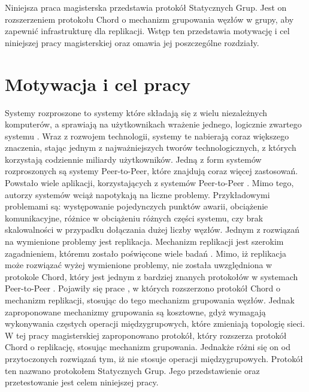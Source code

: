 \documentclass[12pt, twoside, openany]{report}
\begin{document}
Niniejsza praca magisterska przedstawia protokół Statycznych Grup. Jest on rozszerzeniem protokołu Chord o mechanizm grupowania węzłów w grupy, aby zapewnić infrastrukturę dla replikacji. Wstęp ten przedstawia motywację i cel niniejszej pracy magisterskiej oraz omawia jej poszczególne rozdziały.


\section{Motywacja i cel pracy}

Systemy rozproszone to systemy które składają się z wielu niezależnych komputerów, a sprawiają na użytkownikach wrażenie jednego, logicznie zwartego systemu \cite{bib:kobusinska}. Wraz z rozwojem technologii, systemy te nabierają coraz większego znaczenia, stając jednym z najważniejszych tworów technologicznych, z których  korzystają codziennie miliardy użytkowników. Jedną z form systemów rozproszonych są systemy Peer-to-Peer, które znajdują coraz więcej zastosowań. Powstało wiele aplikacji, korzystających z systemów Peer-to-Peer \cite{bib:gnutella, bib:kazaa, bib:freehaven, bib:pastry, bib:pier, bib:edutella, bib:jxta}. Mimo tego, autorzy systemów wciąż napotykają na liczne problemy. Przykładowymi problemami \cite{bib:martins} są: występowanie pojedynczych punktów awarii, obciążenie komunikacyjne, różnice w obciążeniu różnych części systemu, czy brak skalowalności w przypadku dołączania dużej liczby węzłów. Jednym z rozwiązań na wymienione problemy jest replikacja. Mechanizm replikacji jest szerokim zagadnieniem, któremu zostało poświęcone wiele badań \cite{bib:martins, bib:jeyasheeli, bib:ye, bib:paiva, bib:scatter, bib:rollerchain}. Mimo, iż replikacja może rozwiązać wyżej wymienione problemy, nie została uwzględniona w protokole Chord, który jest jednym z bardziej znanych protokołów w systemach Peer-to-Peer \cite{bib:paiva}. Pojawiły się prace \cite{bib:scatter, bib:rollerchain}, w których rozszerzono protokół Chord o mechanizm replikacji, stosując do tego mechanizm grupowania węzłów. Jednak zaproponowane mechanizmy grupowania są kosztowne, gdyż wymagają wykonywania częstych operacji międzygrupowych, które zmieniają topologię sieci. W tej pracy magisterskiej zaproponowano protokół, który rozszerza protokół Chord o replikację, stosując mechanizm grupowania. Jednakże różni się on od przytoczonych rozwiązań tym, iż nie stosuje operacji międzygrupowych. Protokół ten nazwano protokołem Statycznych Grup. Jego przedstawienie oraz przetestowanie jest celem niniejszej pracy.
\end{document}

